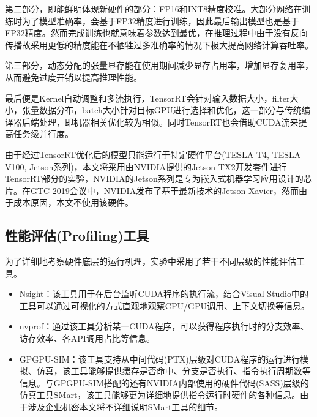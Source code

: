 \par 第二部分，即能鲜明体现新硬件的部分：FP16和INT8精度校准。大部分网络在训练时为了模型准确率，会基于FP32精度进行训练，因此最后输出模型也是基于FP32精度。然而完成训练也就意味着参数达到最优，在推理过程中由于没有反向传播故采用更低的精度能在不牺牲过多准确率的情况下极大提高网络计算吞吐率。
\par 第三部分，动态分配的张量显存能在使用期间减少显存占用率，增加显存复用率，从而避免过度开销以提高推理性能。
\par 最后便是Kernel自动调整和多流执行，TensorRT会针对输入数据大小，filter大小，张量数据分布，batch大小针对目标GPU进行选择和优化，这一部分与传统编译器后端处理，即机器相关优化较为相似。同时TensorRT也会借助CUDA流来提高任务级并行度。
\par 由于经过TensorRT优化后的模型只能运行于特定硬件平台(TESLA T4, TESLA V100, Jetson系列)\cite{TENSORRTDOC}，本文将采用由NVIDIA提供的Jetson TX2开发套件进行TensorRT部分的实验，NVIDIA的Jetson系列是专为嵌入式机器学习应用设计的芯片。在GTC 2019会议中，NVIDIA发布了基于最新技术的Jetson Xavier，然而由于成本原因，本文不使用该硬件。

\subsection{性能评估(Profiling)工具}
\par 为了详细地考察硬件底层的运行机理，实验中采用了若干不同层级的性能评估工具。
\begin{itemize}
	\item Nsight：该工具用于在后台监听CUDA程序的执行流，结合Visual Studio中的工具可以通过可视化的方式直观地观察CPU/GPU调用、上下文切换等信息\cite{NSIGHT}。
	\item nvprof：通过该工具分析某一CUDA程序，可以获得程序执行时的分支效率、访存效率、各API调用占比等信息\cite{NVPROF}。
	\item GPGPU-SIM：该工具支持从中间代码(PTX)层级对CUDA程序的运行进行模拟、仿真，该工具能够提供缓存是否命中、分支是否执行、指令执行周期数等信息\cite{GPGPUSIM}。与GPGPU-SIM搭配的还有NVIDIA内部使用的硬件代码(SASS)层级的仿真工具SMart，该工具能够更为详细地提供指令运行时硬件的各种信息。由于涉及企业机密本文将不详细说明SMart工具的细节。
\end{itemize}
